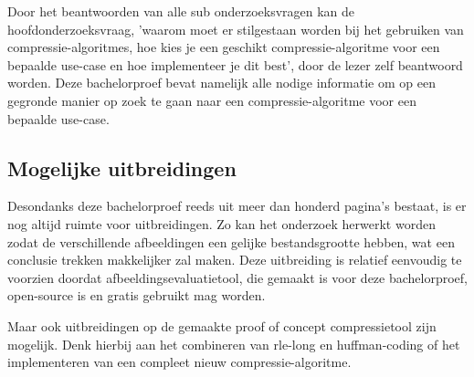 Door het beantwoorden van alle sub onderzoeksvragen kan de hoofdonderzoeksvraag, 'waarom moet er stilgestaan worden bij het gebruiken van \glspl{compressie-algoritme}, hoe kies je een geschikt \gls{compressie-algoritme} voor een bepaalde \gls{use-case} en hoe implementeer je dit best', door de lezer zelf beantwoord worden. Deze bachelorproef bevat namelijk alle nodige informatie om op een gegronde manier op zoek te gaan naar een \gls{compressie-algoritme} voor een bepaalde \gls{use-case}.

\subsection{Mogelijke uitbreidingen}
\label{sec:conclussie-uitbreidingen}

Desondanks deze bachelorproef reeds uit meer dan honderd pagina's bestaat, is er nog altijd ruimte voor uitbreidingen. Zo kan het onderzoek herwerkt worden zodat de verschillende afbeeldingen een gelijke bestandsgrootte hebben, wat een conclusie trekken makkelijker zal maken. Deze uitbreiding is relatief eenvoudig te voorzien doordat \gls{afbeeldingsevaluatietool}, die gemaakt is voor deze bachelorproef, \gls{open-source} is en gratis gebruikt mag worden.

Maar ook uitbreidingen op de gemaakte proof of concept \gls{compressietool} zijn mogelijk. Denk hierbij aan het combineren van \gls{rle-long} en \gls{huffman-coding} of het implementeren van een compleet nieuw \gls{compressie-algoritme}.


